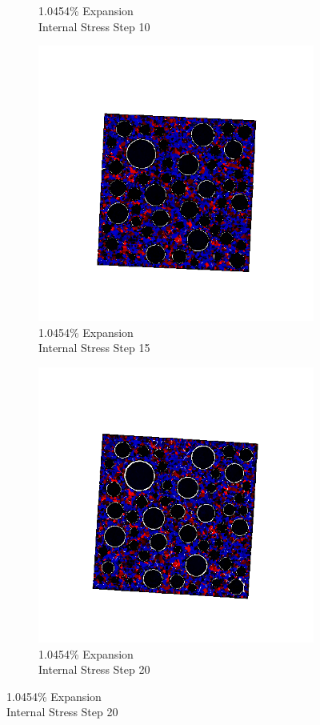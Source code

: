 \begin{figure}[ht!]
\begin{subfigure}{.25\textwidth}
      \caption{1.0454\% Expansion\\Internal Stress Step 10}
    \end{subfigure}%
    \begin{subfigure}{.25\textwidth}
      \centering
      \includegraphics[width=1.0\linewidth]{Files/exp_3D/DEF/A30X-1C_4_s15.png}
      \caption{1.0454\% Expansion\\Internal Stress Step 15}
    \end{subfigure}%
    \begin{subfigure}{.25\textwidth}
      \centering
      \includegraphics[width=1.0\linewidth]{Files/exp_3D/DEF/A30X-1C_4_stress.png}
      \caption{1.0454\% Expansion\\Internal Stress Step 20}
    \end{subfigure}


\end{figure}
